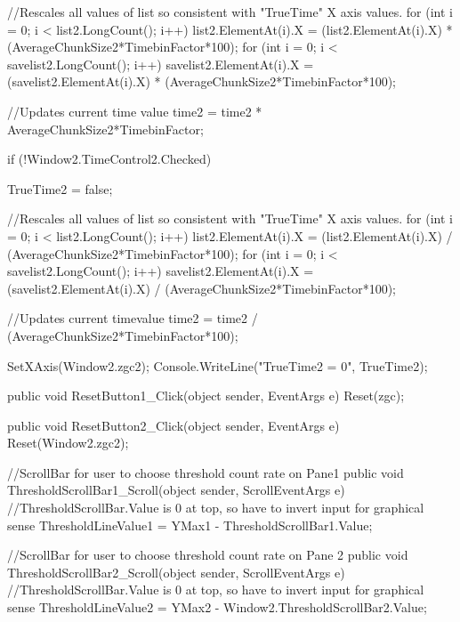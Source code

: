 {{{{                //Rescales all values of list so consistent with "TrueTime" X axis values.
                for (int i = 0; i < list2.LongCount(); i++)
                {
                    list2.ElementAt(i).X = (list2.ElementAt(i).X) * (AverageChunkSize2*TimebinFactor*100);
                }
                for (int i = 0; i < savelist2.LongCount(); i++)
                {
                    savelist2.ElementAt(i).X = (savelist2.ElementAt(i).X) * (AverageChunkSize2*TimebinFactor*100);
                }

                //Updates current time value
                time2 = time2 * AverageChunkSize2*TimebinFactor;
            }
            if (!Window2.TimeControl2.Checked)
            {
                TrueTime2 = false;

                //Rescales all values of list so consistent with "TrueTime" X axis values.
                for (int i = 0; i < list2.LongCount(); i++)
                {
                    list2.ElementAt(i).X = (list2.ElementAt(i).X) / (AverageChunkSize2*TimebinFactor*100);
                }
                for (int i = 0; i < savelist2.LongCount(); i++)
                {
                    savelist2.ElementAt(i).X = (savelist2.ElementAt(i).X) / (AverageChunkSize2*TimebinFactor*100);
                }

                //Updates current timevalue
                time2 = time2 / (AverageChunkSize2*TimebinFactor*100);
            }

            SetXAxis(Window2.zgc2);
            Console.WriteLine("TrueTime2 = {0}", TrueTime2);
        }

        public void ResetButton1_Click(object sender, EventArgs e)
        {
            Reset(zgc);
        }

        public void ResetButton2_Click(object sender, EventArgs e)
        {
            Reset(Window2.zgc2);
        }

        //ScrollBar for user to choose threshold count rate on Pane1
        public void ThresholdScrollBar1_Scroll(object sender, ScrollEventArgs e)
        {
            //ThresholdScrollBar.Value is 0 at top, so have to invert input for graphical sense
            ThresholdLineValue1 = YMax1 - ThresholdScrollBar1.Value;
        }
        
        //ScrollBar for user to choose threshold count rate on Pane 2
        public void ThresholdScrollBar2_Scroll(object sender, ScrollEventArgs e)
        {
            //ThresholdScrollBar.Value is 0 at top, so have to invert input for graphical sense
            ThresholdLineValue2 = YMax2 - Window2.ThresholdScrollBar2.Value;
        }

}}
